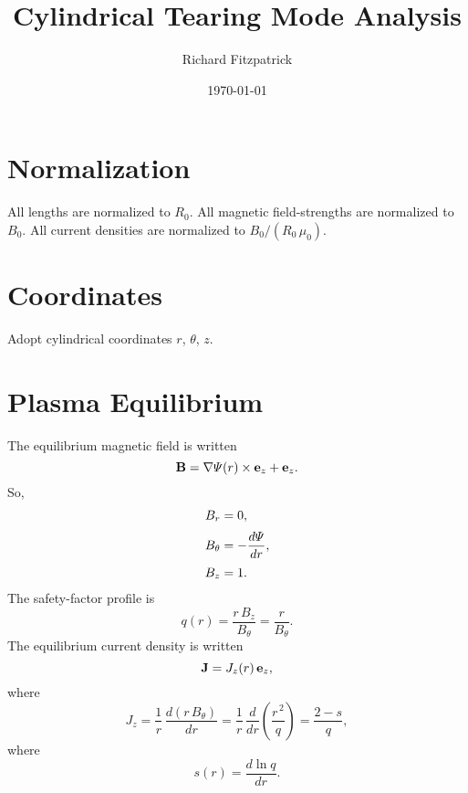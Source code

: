 \documentclass[notitlepage,12pt]{article}
\title{\bf Cylindrical Tearing Mode Analysis}
\date{\today}
\author{Richard Fitzpatrick}
\begin{document}
\maketitle

\section{Normalization}
All lengths are normalized to $R_0$. All magnetic field-strengths are normalized to $B_0$. All current densities are
normalized to $B_0/(R_0\,\mu_0)$. 

\section{Coordinates}
Adopt cylindrical coordinates $r$, $\theta$, $z$. 

\section{Plasma Equilibrium}
The equilibrium magnetic field is written
\begin{equation}
{\bf B} = \nabla{\mit\Psi}(r)\times{\bf e}_z + {\bf e}_z.
\end{equation}
So, 
\begin{align}
B_r &= 0,\\[0.5ex]
B_\theta &= -\frac{d{\mit\Psi}}{dr},\\[0.5ex]
B_z &= 1.
\end{align}
The safety-factor profile is
\begin{equation}
q(r) = \frac{r\,B_z}{B_\theta}= \frac{r}{B_\theta}.
\end{equation}
The equilibrium current density is written
\begin{equation}
{\bf J} = J_z(r)\,{\bf e}_z,
\end{equation}
where
\begin{equation}
J_z = \frac{1}{r}\,\frac{d(r\,B_\theta)}{dr} =\frac{1}{r}\,\frac{d}{dr}\!\left(\frac{r^{\,2}}{q}\right)=\frac{2-s}{q},
\end{equation}
where
\begin{equation}
s(r) = \frac{d\ln q}{dr}.
\end{equation}
\end{document}
